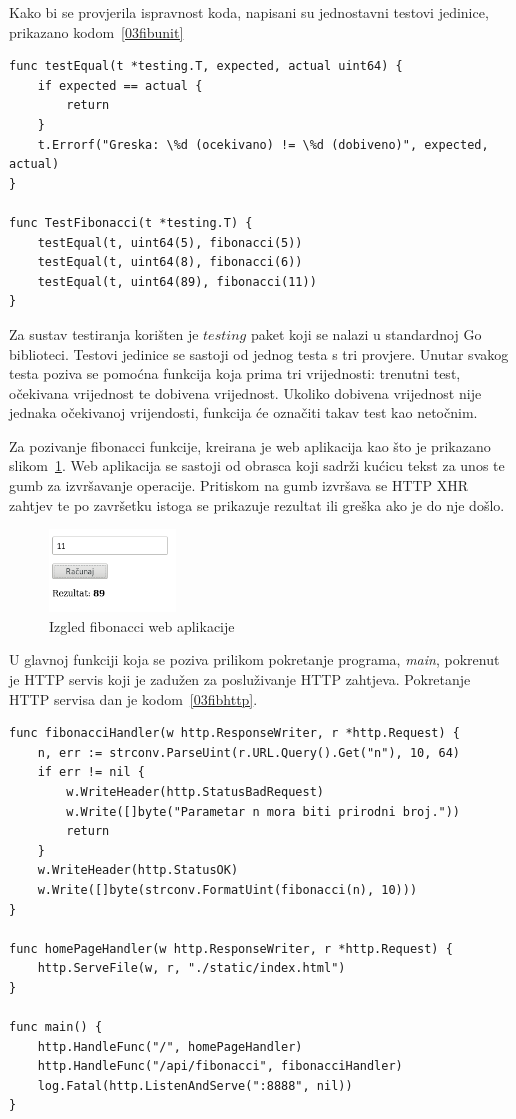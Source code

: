 Kako bi se provjerila ispravnost koda, napisani su jednostavni testovi jedinice, prikazano
kodom~\ref{03fibunit}

\begin{lstlisting}[float=h]
func testEqual(t *testing.T, expected, actual uint64) {
	if expected == actual {
		return
	}
	t.Errorf("Greska: \%d (ocekivano) != \%d (dobiveno)", expected, actual)
}

func TestFibonacci(t *testing.T) {
	testEqual(t, uint64(5), fibonacci(5))
	testEqual(t, uint64(8), fibonacci(6))
	testEqual(t, uint64(89), fibonacci(11))
}

\end{lstlisting}

Za sustav testiranja korišten je $testing$ paket koji se nalazi u standardnoj Go biblioteci. Testovi
jedinice se sastoji od jednog testa s tri provjere. Unutar svakog testa poziva se pomoćna funkcija
koja prima tri vrijednosti: trenutni test, očekivana vrijednost te dobivena vrijednost. Ukoliko
dobivena vrijednost nije jednaka očekivanoj vrijendosti, funkcija će označiti takav test kao
netočnim.

Za pozivanje fibonacci funkcije, kreirana je web aplikacija kao što je prikazano
slikom~\ref{fig:03fibv1png}. Web aplikacija se sastoji od obrasca koji sadrži kućicu tekst za unos
te gumb za izvršavanje operacije. Pritiskom na gumb izvršava se HTTP XHR zahtjev te po završetku
istoga se prikazuje rezultat ili greška ako je do nje došlo.

\begin{figure}[h]
    \centering
    \includegraphics[width=0.3\textwidth]{img/03/fibonacci_html.png}
    \caption{Izgled fibonacci web aplikacije}%
    \label{fig:03fibv1png}
\end{figure}

U glavnoj funkciji koja se poziva prilikom pokretanje programa, \textit{main}, pokrenut je HTTP
servis koji je zadužen za posluživanje HTTP zahtjeva. Pokretanje HTTP servisa dan je
kodom~\ref{03fibhttp}.

\begin{lstlisting}[float=h]
func fibonacciHandler(w http.ResponseWriter, r *http.Request) {
	n, err := strconv.ParseUint(r.URL.Query().Get("n"), 10, 64)
	if err != nil {
		w.WriteHeader(http.StatusBadRequest)
		w.Write([]byte("Parametar n mora biti prirodni broj."))
		return
	}
	w.WriteHeader(http.StatusOK)
	w.Write([]byte(strconv.FormatUint(fibonacci(n), 10)))
}

func homePageHandler(w http.ResponseWriter, r *http.Request) {
	http.ServeFile(w, r, "./static/index.html")
}

func main() {
	http.HandleFunc("/", homePageHandler)
	http.HandleFunc("/api/fibonacci", fibonacciHandler)
	log.Fatal(http.ListenAndServe(":8888", nil))
}
\end{lstlisting}

